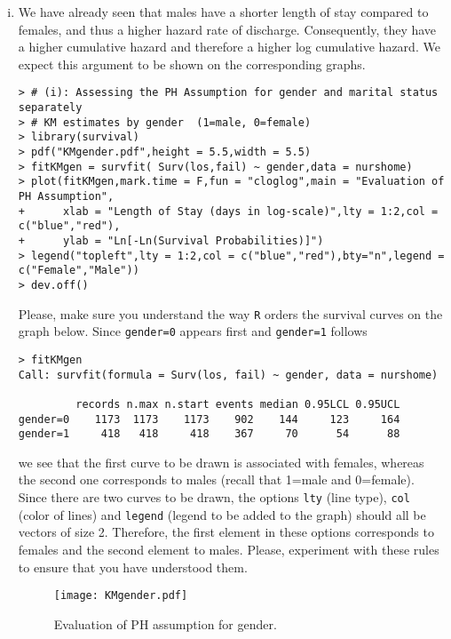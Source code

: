\begin{enumerate}[(i)]
\item We have already seen that males have a shorter length of stay compared to females, and thus a higher hazard rate of discharge. Consequently, they have a higher cumulative hazard and therefore a higher log cumulative hazard. We expect this argument to be shown on the corresponding graphs.
\begin{spacing}{1.2}
\begin{footnotesize}
\begin{verbatim}
> # (i): Assessing the PH Assumption for gender and marital status separately
> # KM estimates by gender  (1=male, 0=female)
> library(survival)
> pdf("KMgender.pdf",height = 5.5,width = 5.5)
> fitKMgen = survfit( Surv(los,fail) ~ gender,data = nurshome)
> plot(fitKMgen,mark.time = F,fun = "cloglog",main = "Evaluation of PH Assumption",
+      xlab = "Length of Stay (days in log-scale)",lty = 1:2,col = c("blue","red"),
+      ylab = "Ln[-Ln(Survival Probabilities)]")
> legend("topleft",lty = 1:2,col = c("blue","red"),bty="n",legend = c("Female","Male"))
> dev.off()
\end{verbatim}
\end{footnotesize}
\end{spacing}
\newpage
Please, make sure you understand the way \verb|R| orders the survival curves on the graph below. Since \verb|gender=0| appears first and \verb|gender=1| follows
\begin{spacing}{1.2}
\begin{footnotesize}
\begin{verbatim}
> fitKMgen
Call: survfit(formula = Surv(los, fail) ~ gender, data = nurshome)

         records n.max n.start events median 0.95LCL 0.95UCL
gender=0    1173  1173    1173    902    144     123     164
gender=1     418   418     418    367     70      54      88
\end{verbatim}
\end{footnotesize}
\end{spacing}
we see that the first curve to be drawn is associated with females, whereas the second one corresponds to males (recall that 1=male and 0=female). Since there are two curves to be drawn, the options \verb|lty| (line type), \verb|col| (color of lines) and \verb|legend| (legend to be added to the graph) should all be vectors of size 2. Therefore, the first element in these options corresponds to females and the second element to males. Please, experiment with these rules to ensure that you have understood them.
\begin{figure}[htbp]
	\centering
		\texttt{[image: KMgender.pdf]}
	\caption{Evaluation of PH assumption for gender.}
	\label{figure1}
\end{figure}


\end{enumerate}
